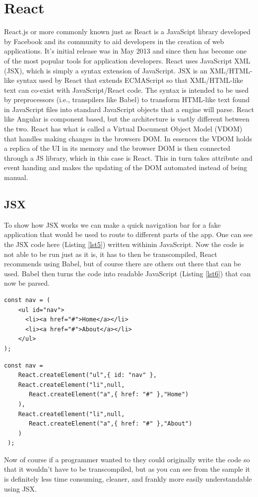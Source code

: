 \documentclass[11pt]{article}
\begin{document}
\section{React}
React.js or more commonly known just as React is a JavaScipt library developed by Facebook and its community to aid developers in the creation
of web applications. It's initial release was in May 2013 and since then has become one of the most popular tools for application developers. React uses 
JavaScript XML (JSX), which is simply a syntax extension of JavaScript. JSX is an XML/HTML-like syntax used by React that extends ECMAScript so that XML/HTML-like text 
can co-exist with JavaScript/React code. The syntax is intended to be used by preprocessors (i.e., transpilers like Babel) to transform HTML-like text found in 
JavaScript files into standard JavaScript objects that a engine will parse\cite{JSXWhatI92:online}. React like Angular is component based, but the architecture is vastly 
different between the two. React has what is called a Virtual Document Object Model (VDOM) that handles making changes in the browsers DOM. In essences the VDOM
holds a replica of the UI in its memory and the browser DOM is then connected through a JS library, which in this case is React. This in turn takes attribute 
and event handing and makes the updating of the DOM automated instead of being manual. 

\subsection{JSX}
To show how JSX works we can make a quick navigation bar for a fake application that would be used to route to different parts of the app. One can see the JSX code here (Listing \ref{lst5}) 
written withinin JavaScript. Now the code is not able to be run just as it is, it has to then be transcompiled, React recommends using Babel, but of course there are others out there that 
can be used. Babel then turns the code into readable JavaScript (Listing \ref{lst6}) that can now be parsed.

\begin{lstlisting}[caption={JSX code sample}, label={lst5}]
const nav = (
    <ul id="nav">
      <li><a href="#">Home</a></li>
      <li><a href="#">About</a></li>
    </ul>
);
\end{lstlisting}

\begin{lstlisting}[caption={Transcompiled JSX}, label={lst6}]
const nav = 
    React.createElement("ul",{ id: "nav" },
    React.createElement("li",null,
       React.createElement("a",{ href: "#" },"Home")
    ),
    React.createElement("li",null,
       React.createElement("a",{ href: "#" },"About")
    )
 );
\end{lstlisting}
Now of course if a programmer wanted to they could originally write the code so that it wouldn't have to be transcompiled, but as you can see from the sample it is definitely less
time consuming, cleaner, and frankly more easily understandable using JSX. 
\end{document}
